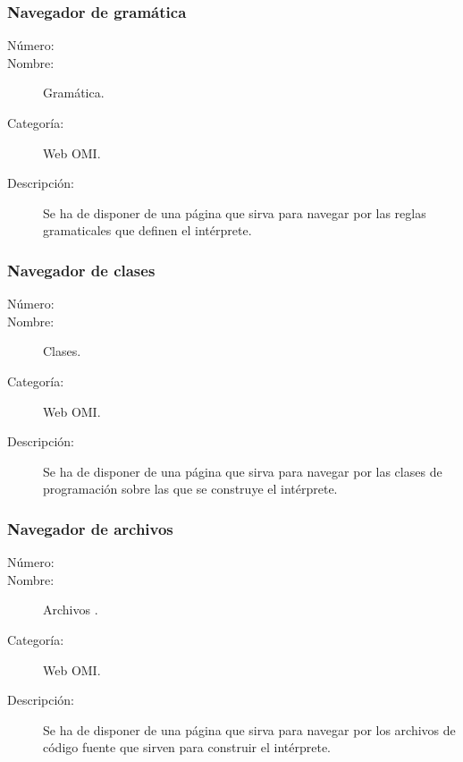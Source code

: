 \subsubsection{Navegador de gramática}
	\begin{description}
		\item [Número:] \cn
		\item [Nombre:] Gramática.
		\item [Categoría:] Web OMI.
		\item [Descripción:]  Se ha de disponer de una página que sirva para navegar por las reglas gramaticales que definen el intérprete.
	\end {description}

\subsubsection{Navegador de clases}
	\begin{description}
		\item [Número:] \cn
		\item [Nombre:] Clases.
		\item [Categoría:] Web OMI.
		\item [Descripción:]  Se ha de disponer de una página que sirva para navegar por las clases de programación sobre las que se construye el 
      intérprete.
	\end {description}

\subsubsection{Navegador de archivos}
	\begin{description}
		\item [Número:] \cn
		\item [Nombre:] Archivos .
		\item [Categoría:] Web OMI.
		\item [Descripción:]  Se ha de disponer de una página que sirva para navegar por los archivos de código fuente que sirven para construir el intérprete.
	\end {description}

